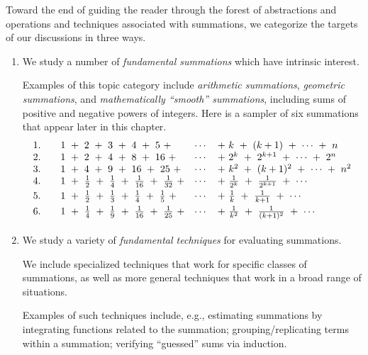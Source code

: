 \bigskip

Toward the end of guiding the reader through the forest of abstractions and operations and techniques associated with summations, we categorize the targets of our discussions in three ways.
\begin{enumerate}
\item
We study a number of {\it fundamental summations} which have intrinsic interest.

\smallskip

Examples of this topic category include {\it arithmetic summations}, {\it geometric summations}, and {\it mathematically ``smooth'' summations}, including sums of positive and negative powers of integers.  Here is a sampler of six summations that appear later in this chapter.
\[
\begin{array}{lclcl}
1.  & &
1 \ + \ 2 \ + \ 3 \ + \ 4 \ + \ 5 \ + & \cdots & + \ k  \ + \ (k+1) \ + \ \cdots \ + \ n \\
2. & &
1 \ + \ 2 \ + \ 4 \ + \ 8 \ + \ 16 \ + & \cdots & + \ 2^k  \ + \ 2^{k+1} \ + \ \cdots \ + \ 2^n \\
3. & &
1 \ + \ 4 \ + \ 9 \ + \ 16 \ + \ 25 \ + & \cdots & + \ k^2  \ + \ (k+1)^2 \ + \ \cdots \ + \ n^2 \\
\smallskip
4. & &
1 \ + \ \frac{1}{2} \ + \ \frac{1}{4} \ + \ \frac{1}{16} \ + \ \frac{1}{32} \ + & \cdots & + \ \frac{1}{2^k}  \ + \ \frac{1}{2^{k+1}} \ + \ \cdots \\
\smallskip
5. & &
1 \ + \ \frac{1}{2} \ + \ \frac{1}{3} \ + \ \frac{1}{4} \ + \ \frac{1}{5} \ + & \cdots & + \ \frac{1}{k}  \ + \ \frac{1}{k+1} \ + \ \cdots \\
\smallskip
6. & &
1 \ + \ \frac{1}{4} \ + \ \frac{1}{9} \ + \ \frac{1}{16} \ + \ \frac{1}{25} \ + & \cdots & + \ \frac{1}{k^2}  \ + \ \frac{1}{(k+1)^2} \ + \ \cdots
\end{array}
\]

\medskip\item
We study a variety of {\it fundamental techniques} for evaluating summations.

\smallskip

We include specialized techniques that work for specific classes of summations, as well as more general techniques that work in a broad range of situations.

\smallskip

Examples of such techniques include, e.g., estimating summations by integrating functions related to the summation; grouping/replicating terms within a summation; verifying ``guessed'' sums via induction.


\end{enumerate}
